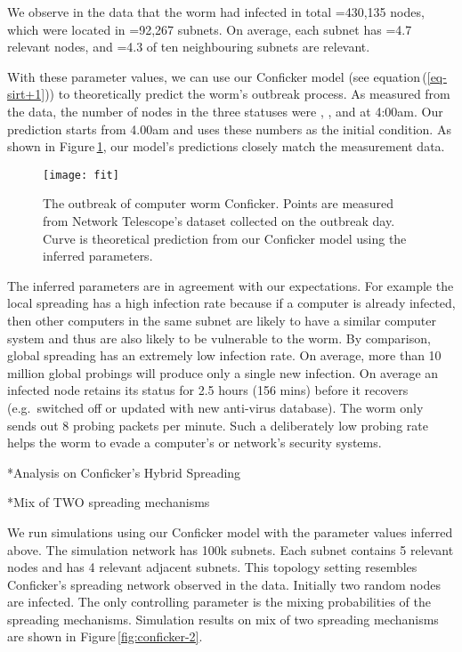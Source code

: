 \documentclass[9pt]{article}
\makeatletter
\newcommand{\reffig}[1]{Figure\,\ref{#1}}
\newcommand{\refeq}[1]{equation\,(\ref{#1})}
\renewcommand{\section}{\@startsection {section}{1}{0pt}{-6pt}{1pt}{\reset@font \large \bfseries}}
\renewcommand{\subsection}{\@startsection {subsection}{2}{0pt}{-6pt}{1pt}{\reset@font \normalsize \bfseries}}
\makeatother
\begin{document}
{We observe in the data that the worm had infected in total =430,135 nodes, which were located in =92,267 subnets. On average, each subnet has =4.7 relevant nodes, and =4.3 of ten neighbouring subnets are relevant.

With these parameter values, we can use our Conficker model (see \refeq{eq-sirt+1}) to theoretically predict the worm's outbreak process. 
As measured from the data, the number of nodes in the three statuses were , , and  at 4:00am. Our prediction starts from 4.00am and uses these numbers as the initial condition. 
As shown in \reffig{fig-fit}, our model's predictions closely match the measurement data.

\begin{figure}[h]
\centering\small
\texttt{[image: fit]}
\caption{\label{fig-fit}The outbreak of computer worm Conficker. Points are measured from Network Telescope's dataset collected on the outbreak day. Curve is theoretical prediction from our Conficker model using the inferred parameters.}
\end{figure}

The inferred parameters are in agreement with our expectations. For example the local spreading has a high infection rate because if a computer is already infected, then other computers in the same subnet are likely to have a similar computer system and thus are also likely to be vulnerable to the worm. 
By comparison, global spreading has an extremely low infection rate. On average, 
more than 10 million global probings will produce only a single new infection. 
On average an infected node retains its status for 2.5 hours (156 mins) before it recovers (e.g.~switched off or updated with new anti-virus database). The worm only sends out 8 probing packets per minute. Such a deliberately low probing rate helps the worm to evade a computer's or network's security systems.

\section*{Analysis on Conficker's Hybrid Spreading}

\subsection*{Mix of TWO spreading mechanisms}


We run simulations using our Conficker model with the parameter values inferred above. The simulation network has 100k subnets. Each subnet contains 5 relevant nodes and has 4 relevant adjacent subnets. This topology setting resembles Conficker's spreading network observed in the data. Initially two random nodes are infected. The only controlling parameter is the mixing probabilities of the spreading mechanisms. Simulation results on mix of two spreading mechanisms are shown in \reffig{fig:conficker-2}.

}
\end{document}

